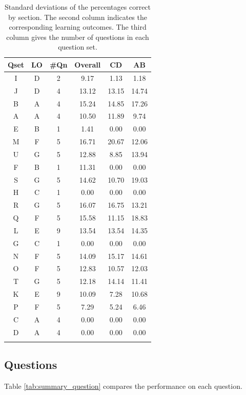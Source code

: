\documentclass[12pt,nohyper]{tufte-handout}\usepackage[]{graphicx}\usepackage[]{color}
\begin{document}
\begin{longtable}{cc|cc|cc}
  \hline
Qset & LO & \#Qn & Overall & CD & AB \\ 
  \hline
I & D &   2 & 9.17 & 1.13 & 1.18 \\ 
  J & D &   4 & 13.12 & 13.15 & 14.74 \\ 
  B & A &   4 & 15.24 & 14.85 & 17.26 \\ 
  A & A &   4 & 10.50 & 11.89 & 9.74 \\ 
  E & B &   1 & 1.41 & 0.00 & 0.00 \\ 
  M & F &   5 & 16.71 & 20.67 & 12.06 \\ 
  U & G &   5 & 12.88 & 8.85 & 13.94 \\ 
  F & B &   1 & 11.31 & 0.00 & 0.00 \\ 
  S & G &   5 & 14.62 & 10.70 & 19.03 \\ 
  H & C &   1 & 0.00 & 0.00 & 0.00 \\ 
  R & G &   5 & 16.07 & 16.75 & 13.21 \\ 
  Q & F &   5 & 15.58 & 11.15 & 18.83 \\ 
  L & E &   9 & 13.54 & 13.54 & 14.35 \\ 
  G & C &   1 & 0.00 & 0.00 & 0.00 \\ 
  N & F &   5 & 14.09 & 15.17 & 14.61 \\ 
  O & F &   5 & 12.83 & 10.57 & 12.03 \\ 
  T & G &   5 & 12.18 & 14.14 & 11.41 \\ 
  K & E &   9 & 10.09 & 7.28 & 10.68 \\ 
  P & F &   5 & 7.29 & 5.24 & 6.46 \\ 
  C & A &   4 & 0.00 & 0.00 & 0.00 \\ 
  D & A &   4 & 0.00 & 0.00 & 0.00 \\ 
   \hline
\hline
\caption{Standard deviations of the percentages correct by section. The second column indicates the corresponding learning outcomes. The third column gives the number of questions in each question set.} 
\label{tab:Qset-sd}
\end{longtable}



\clearpage
\newpage{}
\subsection{Questions}

Table \ref{tab:summary_question} compares the performance on each question. 
\end{document}
